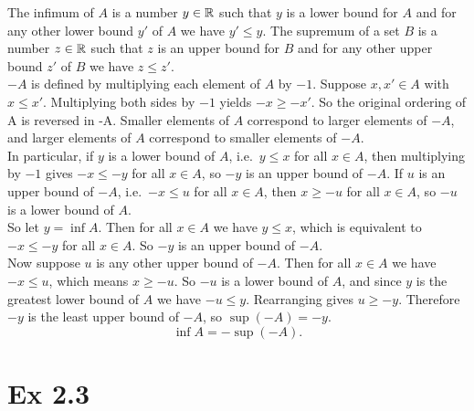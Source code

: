 \documentclass{report}
\begin{document}
\begin{proofWithHibiscus}
  The infimum of $A$ is a number $y \in \mathbb{R}$ such that $y$ is a lower bound for $A$ and for any other lower bound $y'$ of $A$ we have $y' \leq y$. The supremum of a set $B$ is a number $z \in \mathbb{R}$ such that $z$ is an upper bound for $B$ and for any other upper bound $z'$ of $B$ we have $z \leq z'$.  \\

  $-A$ is defined by multiplying each element of $A$ by $-1$. Suppose $x, x' \in A$ with $x \leq x'$. Multiplying both sides by $-1$ yields $-x \geq -x'$. So the original ordering of A is reversed in -A. Smaller elements of $A$ correspond to larger elements of $-A$, and larger elements of $A$ correspond to smaller elements of $-A$. \\

  In particular, if $y$ is a lower bound of $A$, i.e.\ $y \leq x$ for all $x \in A$, then multiplying by $-1$ gives $-x \leq -y$ for all $x \in A$, so $-y$ is an upper bound of $-A$. If $u$ is an upper bound of $-A$, i.e.\ $-x \leq u$ for all $x \in A$, then $x \geq -u$ for all $x \in A$, so $-u$ is a lower bound of $A$. \\

  So let $y = \inf A$. Then for all $x \in A$ we have $y \leq x$, which is equivalent to $-x \leq -y$ for all $x \in A$. So $-y$ is an upper bound of $-A$. \\

  Now suppose $u$ is any other upper bound of $-A$. Then for all $x \in A$ we have $-x \leq u$, which means $x \geq -u$. So $-u$ is a lower bound of $A$, and since $y$ is the greatest lower bound of $A$ we have $-u \leq y$. Rearranging gives $u \geq -y$. Therefore $-y$ is the least upper bound of $-A$, so $\sup(-A) = -y$. \\
  \[
  \inf A = -\sup(-A).
  \]
\end{proofWithHibiscus}

  
\newpage 

\section*{Ex 2.3}

\end{document}
